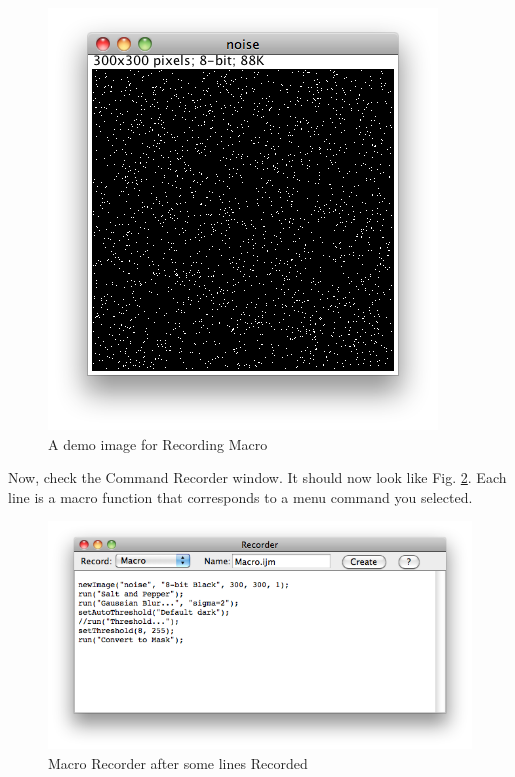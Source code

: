 \documentclass[11pt,a4paper,oneside]{report}
\begin{document}
\begin{figure}[htbp]
\begin{center}
\includegraphics[scale=0.6]{fig/SaltandPepper300.png}
\caption{A demo image for Recording Macro} 
\label{fig_SaltAndPepper}
\end{center}
\end{figure}

Now, check the Command Recorder window. 
It should now look like Fig. \ref{fig_macroRecorderFilled}. 
Each line is a macro function that corresponds to a menu command you selected.

\begin{figure}[htbp]
\begin{center}
\includegraphics[scale=0.6]{fig/MacroRecorderFilled.png}
\caption{Macro Recorder after some lines Recorded} 
\label{fig_macroRecorderFilled}
\end{center}
\end{figure}
\end{document}
